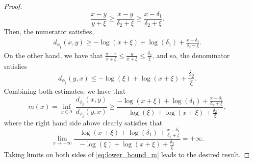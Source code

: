 \documentclass[10pt,a4paper]{amsart}
\def\cS{{\mathcal{S}}}
\begin{document}
\begin{proof}
$$
\frac{x-y}{y+\xi}\geq \frac{x-y}{\delta_2+\xi}\geq\frac{x-\delta_1}{\delta_2+\xi}.
$$
Then, the numerator satisfies,
$$
\begin{aligned}
d_{\phi_\xi}(x,y)\geq  -\log(x+\xi)+\log(\delta_1)+\frac{x-\delta_1}{\delta_2+\xi}.
\end{aligned}
$$
On the other hand, we have that $\frac{y-x}{x+\xi}\leq \frac{y}{x+\xi}\leq \frac{\delta_2}{\xi}$, and so, the denominator satisfies
$$
 d_{\phi_\xi}(y,x)\leq -\log(\xi)+\log(x+\xi)+\frac{\delta_2}{\xi}.
$$
Combining both estimates, we have that
\begin{equation}\label{eq:lower_bound_m}
m(x)=\underset{y \in \cS}{\inf} \, \frac{d_{\phi_\xi}(x,y)}{d_{\phi_\xi}(y,x)}\geq\frac{-\log(x+\xi)+\log(\delta_1)+\frac{x-\delta_1}{\delta_2+\xi}}{-\log(\xi)+\log(x+\xi)+\frac{\delta_2}{\xi}},
\end{equation}
where the right hand side above clearly satisfies that
$$
\underset{x \to + \infty}{\operatorname{lim}} \frac{-\log(x+\xi)+\log(\delta_1)+\frac{x-\delta_1}{\delta_2+\xi}}{-\log(\xi)+\log(x+\xi)+\frac{\delta_2}{\xi}}= + \infty.
$$
Taking limits on both sides of \eqref{eq:lower_bound_m} leads to the desired result. 
\end{proof}
\end{document}
